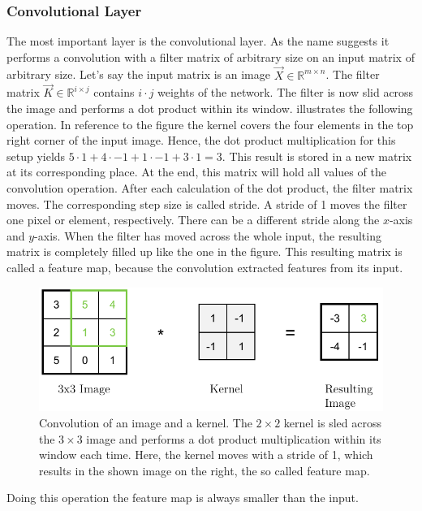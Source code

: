 \subsubsection{Convolutional Layer}
\label{sec:cnn-convolutional-layer}
The most important layer is the convolutional layer.
As the name suggests it performs a convolution with a filter matrix of arbitrary size on an input matrix of arbitrary size.
Let's say the input matrix is an image $\vec{X} \in \mathbb{R}^{m \times n}$.
The filter matrix $\vec{K} \in \mathbb{R}^{i \times j}$ contains $i \cdot j$ weights of the network.
The filter is now slid across the image and performs a dot product within its window.
 illustrates the following operation.
In reference to the figure the kernel covers the four elements in the top right corner of the input image.
Hence, the dot product multiplication for this setup yields $5 \cdot 1+4 \cdot -1+1 \cdot -1+3 \cdot 1=3$.
This result is stored in a new matrix at its corresponding place.
At the end, this matrix will hold all values of the convolution operation.
After each calculation of the dot product, the filter matrix moves.
The corresponding step size is called stride.
A stride of 1 moves the filter one pixel or element, respectively.
There can be a different stride along the $x$-axis and $y$-axis.
When the filter has moved across the whole input, the resulting matrix is completely filled up like the one in the figure.
This resulting matrix is called a feature map, because the convolution extracted features from its input.
\begin{figure}
	\centering
	\includegraphics{images/convolution.pdf}
	\caption[Convolution of an Image and a Kernel]{Convolution of an image and a kernel. The $2 \times 2$ kernel is sled across the $3 \times 3$ image and performs a dot product multiplication within its window each time. Here, the kernel moves with a stride of 1, which results in the shown image on the right, the so called feature map.}
	\label{fig:convolution}
\end{figure}
Doing this operation the feature map is always smaller than the input.
